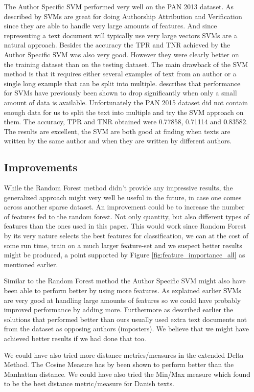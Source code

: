 The Author Specific SVM performed very well on the PAN 2013 dataset. As
described by \cite{stamatos2009} \gls{SVM}s are great for doing Authorship
Attribution and Verification since they are able to handle very large amounts of
features. And since representing a text document will typically use very large
vectors \gls{SVM}s are a natural approach. Besides the accuracy the \gls{TPR}
and \gls{TNR} achieved by the Author Specific SVM was also very good. However
they were clearly better on the training dataset than on the testing dataset.
The main drawback of the SVM method is that it requires either several examples
of text from an author or a single long example that can be split into multiple.
\cite{stamatos2009} describes that performance for \gls{SVM}s have previously
been shown to drop significantly when only a small amount of data is available.
Unfortunately the PAN 2015 dataset did not contain enough data for us to split
the text into multiple and try the SVM approach on them. The accuracy, \gls{TPR}
and \gls{TNR} obtained were 0.77858, 0.71114 and 0.83582. The results are
excellent, the \gls{SVM} are both good at finding when texts are written by the
same author and when they are written by different authors.

\subsection{Improvements}

While the Random Forest method didn't provide any impressive results, the
generalized approach might very well be useful in the future, in case one comes
across another sparse dataset. An improvement could be to increase the number
of features fed to the random forest. Not only quantity, but also different
types of features than the ones used in this paper. This would work since
Random Forest by its very nature selects the best features for classification,
we can at the cost of some run time, train on a much larger feature-set and
we suspect better results might be produced, a point supported by Figure
\ref{fig:feature_importance_all} as mentioned earlier.

Similar to the Random Forest method the Author Specific SVM might also have been
able to perform better by using more features. As explained earlier \gls{SVM}s
are very good at handling large amounts of features so we could have probably
improved performance by adding more. Furthermore as described earlier the
solutions that performed better than ours usually used extra text documents not
from the dataset as opposing authors (imposters). We believe that we might have
achieved better results if we had done that too.

We could have also tried more distance metrics/measures in the extended Delta
Method. The Cosine Measure has by \cite{evert2015towards} been shown to perform
better than the Manhattan distance. We could have also tried the Min/Max measure
which \cite{aalykke2016} found to be the best distance metric/measure for Danish
texts.
